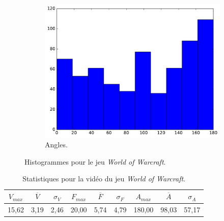 \begin{appendices}
\begin{figure}[htbp]
\begin{subfigure}[t]{\subImgWclicks}
			\centering
			\includegraphics[width=\textwidth]{figures/ch3/wow_angle}
			\caption{Angles.}
			\label{fig:wow_angle}
		\end{subfigure}
		\caption[Histogrammes pour le jeu \emph{World of Warcraft}]{Histogrammes pour le jeu \emph{World of Warcraft}.}
		\label{fig:histWow}
	\end{figure}	
	
	
\begin{table}
	\centering
	\begin{tabular}{c c c c c c c c c}
		$V_{max}$	& $\overline{V}$	& $\sigma_{V}$	& $F_{max}$	& $\overline{F}$	& $\sigma_{F}$	& $A_{max}$	& $\overline{A}$	& $\sigma_{A}$	\bigstrut[b] \\ \hline

		15,62		& 3,19				& 2,46			& 20,00		& 5,74				& 4,79			& 180,00	& 98,03				& 57,17			\bigstrut[t] \\
	\end{tabular}
	\caption[Statistiques pour la vidéo du jeu \emph{World of Warcraft}]{Statistiques pour la vidéo du jeu \emph{World of Warcraft}.}
	\label{tab:wow_stats}
\end{table}
	





\end{appendices}
